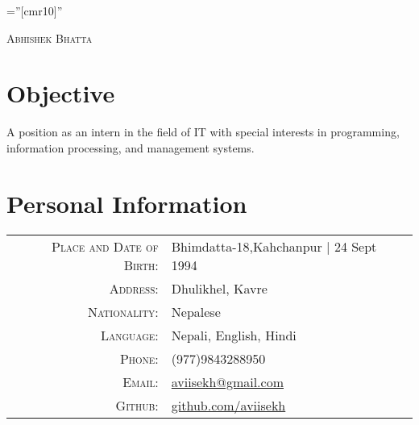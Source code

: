 \documentclass[a4paper,10pt]{article}
\begin{document}

\pagestyle{empty} %

\font\fb=''[cmr10]'' %

\par{\centering
		{\huge \textsc{Abhishek Bhatta}
	}\bigskip\par}

\section{Objective}
A position as an intern in the field of IT with special interests in programming, information processing, and management systems.

\section{Personal Information}

\begin{tabular}{rl}
    \textsc{Place and Date of Birth:} & Bhimdatta-18,Kahchanpur  | 24 Sept 1994 \\
    \textsc{Address:}   & Dhulikhel, Kavre \\
    \textsc{Nationality:} & Nepalese\\
    \textsc{Language:} & Nepali, English, Hindi\\
    \textsc{Phone:}     & (977)9843288950\\
    \textsc{Email:}     & \href{mailto:aviisekh@gmail.com}{aviisekh@gmail.com}\\
    \textsc{Github:} & \href{https://www.github.com/aviisekh}{github.com/aviisekh}\\
\end{tabular}

\end{document}

